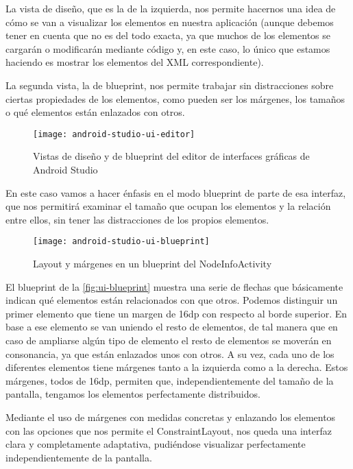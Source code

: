 La vista de diseño, que es la de la izquierda, nos permite hacernos una idea de cómo se van a visualizar los elementos en nuestra aplicación (aunque debemos tener en cuenta que no es del todo exacta, ya que muchos de los elementos se cargarán o modificarán mediante código y, en este caso, lo único que estamos haciendo es mostrar los elementos del XML correspondiente).

La segunda vista, la de blueprint, nos permite trabajar sin distracciones sobre ciertas propiedades de los elementos, como pueden ser los márgenes, los tamaños o qué elementos están enlazados con otros.

\begin{figure}[H]
	\centering
	\texttt{[image: android-studio-ui-editor]}
	\caption{Vistas de diseño y de blueprint del editor de interfaces gráficas de Android Studio}
	\label{fig:android-studio-ui-editor}
\end{figure}

En este caso vamos a hacer énfasis en el modo blueprint de parte de esa interfaz, que nos permitirá examinar el tamaño que ocupan los elementos y la relación entre ellos, sin tener las distracciones de los propios elementos. 

\begin{figure}[H]
	\centering
	\texttt{[image: android-studio-ui-blueprint]}
	\caption{Layout y márgenes en un blueprint del NodeInfoActivity}
	\label{fig:ui-blueprint}
\end{figure}

El blueprint de la \autoref{fig:ui-blueprint} muestra una serie de flechas que básicamente indican qué elementos están relacionados con que otros. Podemos distinguir un primer elemento que tiene un margen de 16dp con respecto al borde superior. En base a ese elemento se van uniendo el resto de elementos, de tal manera que en caso de ampliarse algún tipo de elemento el resto de elementos se moverán en consonancia, ya que están enlazados unos con otros. A su vez, cada uno de los diferentes elementos tiene márgenes tanto a la izquierda como a la derecha. Estos márgenes, todos de 16dp, permiten que, independientemente del tamaño de la pantalla, tengamos los elementos perfectamente distribuidos.

Mediante el uso de márgenes con medidas concretas y enlazando los elementos con las opciones que nos permite el ConstraintLayout, nos queda una interfaz clara y completamente adaptativa, pudiéndose visualizar perfectamente independientemente de la pantalla.

